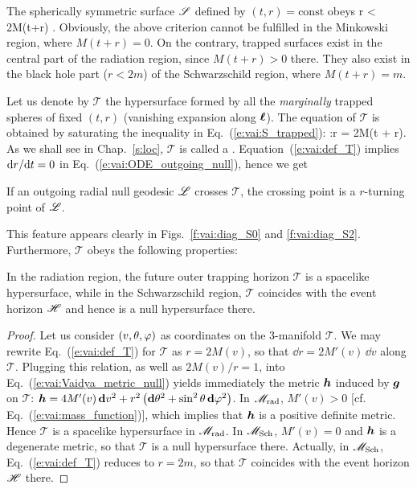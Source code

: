 \begin{prop}
\label{p:vai:trapped_surfaces}
The spherically symmetric surface $\mathscr{S}$ defined by $(t,r) = \mathrm{const}$ obeys
\be \label{e:vai:S_trapped}
    \Sp {} \iff r < 2M(t+r) .
\ee
Obviously, the above criterion cannot be fulfilled in the Minkowski region, where $M(t+r) = 0$.
On the contrary, trapped surfaces exist
in the central part of the radiation region, since $M(t+r) > 0$ there.
They also exist in the black hole part ($r < 2m$)
of the Schwarzschild region, where
$M(t+r) = m$.
\end{prop}

Let us denote by $\mathscr{T}$ the hypersurface formed by
all the \emph{marginally} trapped spheres
of fixed $(t,r)$ (vanishing expansion along $\bm{\ell}$). The equation
of $\mathscr{T}$ is obtained by saturating the inequality
in Eq.~(\ref{e:vai:S_trapped}):
\be \label{e:vai:def_T}
    :\qquad r = 2M(t + r).
\ee
As we shall see in
Chap.~\ref{s:loc}, $\mathscr{T}$ is called a
.
Equation~(\ref{e:vai:def_T}) implies $\mathrm{d} r / \mathrm{d} t = 0$ in Eq.~(\ref{e:vai:ODE_outgoing_null}),
hence we get
\begin{prop}
If an outgoing radial null geodesic $\mathscr{L}$ crosses $\mathscr{T}$,
the crossing point is a $r$-turning point of $\mathscr{L}$.
\end{prop}
This feature appears clearly in Figs.~\ref{f:vai:diag_S0} and \ref{f:vai:diag_S2}.
Furthermore, $\mathscr{T}$ obeys the following properties:
\begin{prop}
In the radiation region, the future outer trapping horizon $\mathscr{T}$ is a
spacelike hypersurface, while in the Schwarzschild region, $\mathscr{T}$
coincides with the event horizon $\mathscr{H}$ and hence is a null hypersurface there.
\end{prop}
\begin{proof}
Let us consider $(v,\theta,\varphi)$ as coordinates on the 3-manifold $\mathscr{T}$.
We may rewrite Eq.~(\ref{e:vai:def_T}) for $\mathscr{T}$ as $r = 2M(v)$, so that
$\dd r = 2M'(v) \, \dd v$ along $\mathscr{T}$.
Plugging this relation, as well as $2M(v)/r=1$, into Eq.~(\ref{e:vai:Vaidya_metric_null})
yields immediately the metric $\bm{h}$ induced by $\bm{g}$ on $\mathscr{T}$:
$\bm{h} = 4 M'(v) \, \mathbf{d} v^2
        + r^2 \left( \mathbf{d}\theta^2 + \sin^2\theta\, \mathbf{d}\varphi^2 \right)$.
In $\mathscr{M}_{\rm rad}$, $M'(v) > 0$ [cf. Eq.~(\ref{e:vai:mass_function})], which
implies that $\bm{h}$ is a positive definite metric. Hence $\mathscr{T}$
is a spacelike hypersurface in $\mathscr{M}_{\rm rad}$. In $\mathscr{M}_{\rm Sch}$, $M'(v) = 0$ and $\bm{h}$
is a degenerate metric, so that $\mathscr{T}$ is a null hypersurface there.
Actually, in $\mathscr{M}_{\rm Sch}$, Eq.~(\ref{e:vai:def_T}) reduces
to $r = 2m$, so that $\mathscr{T}$ coincides with the event horizon $\mathscr{H}$ there.
\end{proof}

